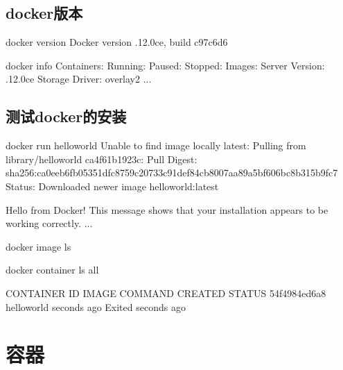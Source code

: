\documentclass[letterpaper,10pt,english]{sphinxmanual}
\begin{document}
\section{docker版本}
\label{\detokenize{_u5feb_u901f_u5165_u95e8/01-docker_u6982_u5ff5:id4}}
%
\begin{sphinxVerbatim}[commandchars=\\\{\}]
docker \PYGZhy{}\PYGZhy{}version
Docker version .12.0\PYGZhy{}ce, build c97c6d6

docker info
Containers: 
Running: 
Paused: 
Stopped: 
Images: 
Server Version: .12.0\PYGZhy{}ce
Storage Driver: overlay2
...
\end{sphinxVerbatim}


\section{测试docker的安装}
\label{\detokenize{_u5feb_u901f_u5165_u95e8/01-docker_u6982_u5ff5:id5}}
%
\begin{sphinxVerbatim}[commandchars=\\\{\}]
docker run hello\PYGZhy{}world
Unable to find image  locally
latest: Pulling from library/hello\PYGZhy{}world
ca4f61b1923c: Pull 
Digest: sha256:ca0eeb6fb05351dfc8759c20733c91def84cb8007aa89a5bf606bc8b315b9fc7
Status: Downloaded newer image  hello\PYGZhy{}world:latest

Hello from Docker!
This message shows that your installation appears to be working correctly.
...

docker image ls

docker container ls \PYGZhy{}\PYGZhy{}all

CONTAINER ID     IMAGE           COMMAND      CREATED            STATUS
54f4984ed6a8     hello\PYGZhy{}world           seconds ago     Exited   seconds ago
\end{sphinxVerbatim}


\chapter{容器}
\label{\detokenize{_u5feb_u901f_u5165_u95e8/02-_u5bb9_u5668::doc}}\label{\detokenize{_u5feb_u901f_u5165_u95e8/02-_u5bb9_u5668:id1}}
\end{document}
